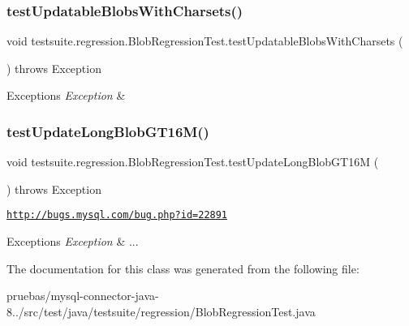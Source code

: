 \subsubsection{\texorpdfstring{test\+Updatable\+Blobs\+With\+Charsets()}{testUpdatableBlobsWithCharsets()}}
{\footnotesize\ttfamily void testsuite.\+regression.\+Blob\+Regression\+Test.\+test\+Updatable\+Blobs\+With\+Charsets (\begin{DoxyParamCaption}{ }\end{DoxyParamCaption}) throws Exception}


\begin{DoxyExceptions}{Exceptions}
{\em Exception} & \\
\hline
\end{DoxyExceptions}
\mbox{\label{classtestsuite_1_1regression_1_1_blob_regression_test_a25e07d454d6ad14097ae4b5c5b1bab10}} 
\subsubsection{\texorpdfstring{test\+Update\+Long\+Blob\+G\+T16\+M()}{testUpdateLongBlobGT16M()}}
{\footnotesize\ttfamily void testsuite.\+regression.\+Blob\+Regression\+Test.\+test\+Update\+Long\+Blob\+G\+T16M (\begin{DoxyParamCaption}{ }\end{DoxyParamCaption}) throws Exception}

\href{http://bugs.mysql.com/bug.php?id=22891}{\tt http\+://bugs.\+mysql.\+com/bug.\+php?id=22891}


\begin{DoxyExceptions}{Exceptions}
{\em Exception} & ... \\
\hline
\end{DoxyExceptions}


The documentation for this class was generated from the following file\+:\begin{DoxyCompactItemize}
\item 
pruebas/mysql-\/connector-\/java-\/8../src/test/java/testsuite/regression/Blob\+Regression\+Test.\+java\end{DoxyCompactItemize}
